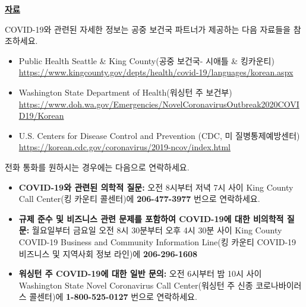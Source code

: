 \documentclass[10pt]{article}
\begin{document}
\bigskip

\large \underline{\textbf{자료}}

COVID-19와 관련된 자세한 정보는 공중 보건국 파트너가 제공하는 다음 자료들을 참조하세요.

\begin{itemize}
\item
  Public Health \textemdash Seattle \& King County(공중 보건국- 시애틀 \& 킹카운티)\\
  \url{https://www.kingcounty.gov/depts/health/covid-19/languages/korean.aspx}

\item

  Washington State Department of Health(워싱턴 주 보건부)\\
  \url{https://www.doh.wa.gov/Emergencies/NovelCoronavirusOutbreak2020COVID19/Korean}

\item
  U.S. Centers for Disease Control and Prevention (CDC, 미 질병통제예방센터)\\
  \url{https://korean.cdc.gov/coronavirus/2019-ncov/index.html}

\end{itemize}

전화 통화를 원하시는 경우에는 다음으로 연락하세요.

\begin{itemize}

\item

  \textbf{COVID-19와 관련된 의학적 질문: } 오전 8시부터 저녁 7시 사이 King County Call
  Center(킹 카운티 콜센터)에 \textbf{206-477-3977} 번으로 연락하세요.

\item

  \textbf{규제 준수 및 비즈니스 관련 문제를 포함하여 COVID-19에 대한 비의학적 질문:} 월요일부터
  금요일 오전 8시 30분부터 오후 4시 30분 사이 King County COVID-19 Business and
  Community Information Line(킹 카운티 COVID-19 비즈니스 및 지역사회 정보 라인)에
  \textbf{206-296-1608}

\item

  \textbf{워싱턴 주 COVID-19에 대한 일반 문의:} 오전 6시부터 밤 10시 사이 Washington
  State Novel Coronavirus Call Center(워싱턴 주 신종 코로나바이러스 콜센터)에
  \textbf{1-800-525-0127} 번으로 연락하세요.

\end{itemize}

\bigskip
\end{document}
